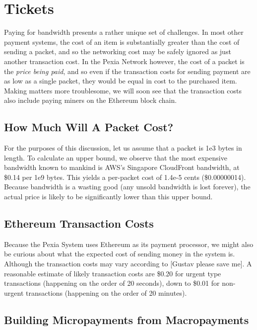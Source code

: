 \documentclass{article}
\newcommand{\mesh}{Pexia}
\begin{document}
\section{Tickets}
\label{sec:tickets}

Paying for bandwidth presents a rather unique set of challenges. In most other payment systems, the cost of an item is substantially greater than the cost of sending a packet, and so the networking cost may be safely ignored as just another transaction cost. In the \mesh{} Network however, the cost of a packet is the \emph{price being paid}, and so even if the transaction costs for sending payment are as low as a single packet, they would be equal in cost to the purchased item. Making matters more troublesome, we will soon see that the transaction costs also include paying miners on the Ethereum block chain.

\subsection{How Much Will A Packet Cost?}

For the purposes of this discussion, let us assume that a packet is 1e3 bytes in length. To calculate an upper bound, we observe that the most expensive bandwidth known to mankind is AWS's Singapore CloudFront bandwidth, at \$0.14 per 1e9 bytes. This yields a per-packet cost of 1.4e-5 cents (\$0.00000014). Because bandwidth is a wasting good (any unsold bandwidth is lost forever), the actual price is likely to be significantly lower than this upper bound.

\subsection{Ethereum Transaction Costs}

Because the \mesh{} System uses Ethereum as its payment processor, we might also be curious about what the expected cost of sending money in the system is. Although the transaction costs may vary according to [Gustav please save me]. A reasonable estimate of likely transaction costs are \$0.20 for urgent type transactions (happening on the order of 20 seconds), down to \$0.01 for non-urgent transactions (happening on the order of 20 minutes).

\subsection{Building Micropayments from Macropayments}
\end{document}
